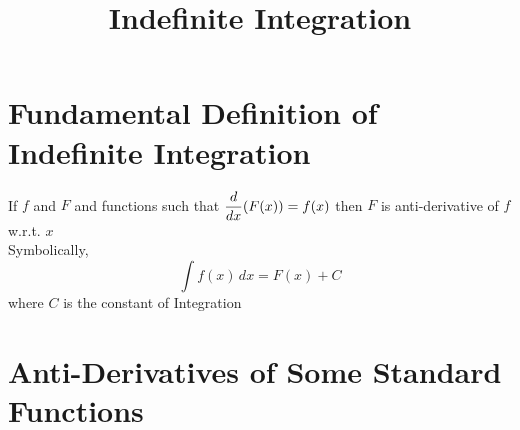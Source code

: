 \documentclass{article}
\title{Indefinite Integration}
\author{}
\date{}
\begin{document}
\maketitle

\section{Fundamental Definition of \\ Indefinite Integration}
If $f$ and $F$ and functions such that $\displaystyle\dv{x}(F(x))=f(x)$ then $F$ is anti-derivative of $f$ w.r.t. $x$
\\
Symbolically, $$\displaystyle\int f(x) \,dx=F(x)+C$$
where $C$ is the constant of Integration

\section{Anti-Derivatives of Some Standard Functions}
\end{document}
